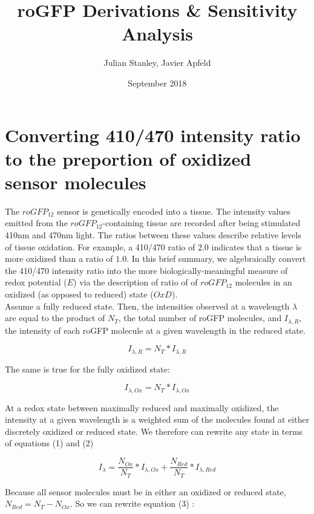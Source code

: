 \documentclass{article}
\title{roGFP Derivations \& Sensitivity Analysis}
\author{Julian Stanley, Javier Apfeld}
\date{September 2018}
\begin{document}
\maketitle

\section{Converting 410/470 intensity ratio to the preportion of oxidized sensor molecules}
The $roGFP_{12}$ sensor is genetically encoded into a tissue. The intensity values emitted from the $roGFP_{12}$-containing tissue are recorded after being stimulated 410nm and 470nm light. The ratios between these values describe relative levels of tissue oxidation. For example, a 410/470 ratio of $2.0$ indicates that a tissue is more oxidized than a ratio of $1.0$. In this brief summary, we algebraically convert the 410/470 intensity ratio into the more biologically-meaningful measure of redox potential ($E$) via the description of ratio of of $roGFP_{12}$ molecules in an oxidized (as opposed to reduced) state ($OxD$). \\

Assume a fully reduced state. Then, the intensities observed at a wavelength $\lambda$ are equal to the product of $N_T$, the total number of roGFP molecules, and $I_{\lambda, R}$, the intensity of each roGFP molecule at a given wavelength in the  reduced state.

\begin{equation}
I_{\lambda, R} = N_T * I_{\lambda, R}
\end{equation}

The same is true for the fully oxidized state:

\begin{equation}
I_{\lambda, Ox} = N_T * I_{\lambda, Ox}
\end{equation}


At a redox state between maximally reduced and maximally oxidized, the intensity at a given wavelength is a weighted sum of the molecules found at either discretely oxidized or reduced state. We therefore can rewrite any state in terms of equations (1) and (2)

\begin{equation}
I_{\lambda} = \frac{N_{Ox}}{N_T} * I_{\lambda, Ox} +  \frac{N_{Red}}{N_T} * I_{\lambda, Red}
\end{equation}

Because all sensor molecules must be in either an oxidized or reduced state, $N_{Red} = N_T - N_{Ox}$. So we can rewrite equation (3) :
\end{document}
